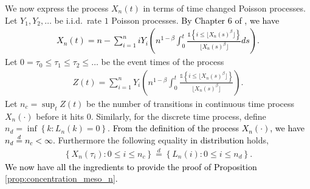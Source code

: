 \documentclass[letterpaper,11pt,reqno]{amsart}
\theoremstyle{definition}
\renewcommand{\leq}{\leqslant}
\newcommand{\ind}{\mathds{1}}
\newcommand{\set}[1]{\left\{#1\right\}}
\begin{document}
We now express the process $X_n(t)$ in terms of time changed Poisson processes. Let $Y_1,Y_2,\dots$ be i.i.d.\ rate $1$ Poisson processes. \textcolor{black}{By Chapter 6 of \cite{kurtz-ethier}, we have \begin{align}\label{eqn:defn-x_n(t)}
    X_n(t) = n - \sum_{i=1}^n i Y_i\left(n^{1-\beta}\int_{0}^t \frac{\ind\set{i\leq \lfloor X_n(s)^\beta\rfloor }}{\lfloor X_n(s)^\beta\rfloor}ds\right).
\end{align}}
    Let $0 = \tau_0 \leq \tau_1 \leq \tau_2 \leq \dots$ be the event times of the process \begin{align}\label{eqn:def-z(t)}
        Z(t) = \sum_{i=1}^n Y_{i}\left(n^{1-\beta}\int_{0}^t \frac{\ind\set{i\leq \lfloor X_n(s)^\beta \rfloor}}{\lfloor X_n(s)^\beta\rfloor}\right).
    \end{align} Let $n_c = \sup_{t}Z(t)$ be the number of transitions in continuous time process $X_n(\cdot)$ before it hits $0$. Similarly, for the discrete time process, define $n_d = \inf\set{k: L_n(k) = 0}$. \textcolor{black}{From the definition of the process $X_n(\cdot)$,  we have $n_d \stackrel{d}{=} n_c <\infty$.} Furthermore the following equality \textcolor{black}{in distribution} holds, \begin{align}\label{eqn:dist-equl-cont-disc}
       \set{X_n(\tau_i):0\leq i\leq n_c} \stackrel{d}{=} \set{L_n(i):0\leq i\leq n_d}. 
    \end{align}
\textcolor{black}{We now have all the ingredients to provide the proof of Proposition \ref{prop:concentration_meso_n}.}
\end{document}
